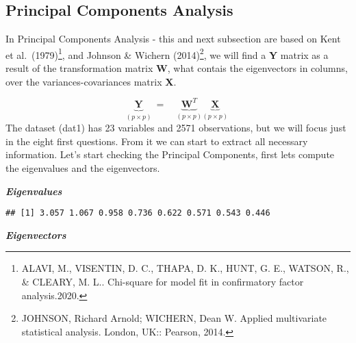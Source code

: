 \documentclass[
]{article}
\newenvironment{Shaded}{\begin{snugshade}}{\end{snugshade}}
\newcommand{\DecValTok}[1]{\textcolor[rgb]{0.00,0.00,0.81}{#1}}
\newcommand{\FunctionTok}[1]{\textcolor[rgb]{0.00,0.00,0.00}{#1}}
\newcommand{\NormalTok}[1]{#1}
\newcommand{\OtherTok}[1]{\textcolor[rgb]{0.56,0.35,0.01}{#1}}
\newcommand{\SpecialCharTok}[1]{\textcolor[rgb]{0.00,0.00,0.00}{#1}}
\begin{document}
\hypertarget{principal-components-analysis}{%
\subsection{Principal Components
Analysis}\label{principal-components-analysis}}

In Principal Components Analysis - this and next subsection are based on
Kent et al.~(1979)\footnote{ALAVI, M., VISENTIN, D. C., THAPA, D. K.,
  HUNT, G. E., WATSON, R., \& CLEARY, M. L.. Chi-square for model fit in
  confirmatory factor analysis.2020.}, and Johnson \& Wichern
(2014)\footnote{JOHNSON, Richard Arnold; WICHERN, Dean W. Applied
  multivariate statistical analysis. London, UK:: Pearson, 2014.}, we
will find a \textbf{Y} matrix as a result of the transformation matrix
\textbf{W}, what contais the eigenvectors in columns, over the
variances-covariances matrix \textbf{X}.

\[
\underbrace{\mathbf{Y}}_{(p \times p)} \: = \quad
\underbrace{\mathbf{W}^{T}}_{(p \times p)}
\underbrace{\mathbf{X}}_{(p \times p)}\:
\] The dataset (dat1) has 23 variables and 2571 observations, but we
will focus just in the eight first questions. From it we can start to
extract all necessary information. Let's start checking the Principal
Components, first lets compute the eigenvalues and the eigenvectors.

\textbf{\emph{Eigenvalues}}

\begin{Shaded}
\end{Shaded}

\begin{verbatim}
## [1] 3.057 1.067 0.958 0.736 0.622 0.571 0.543 0.446
\end{verbatim}

\textbf{\emph{Eigenvectors}}

\begin{Shaded}
\end{Shaded}
\end{document}

